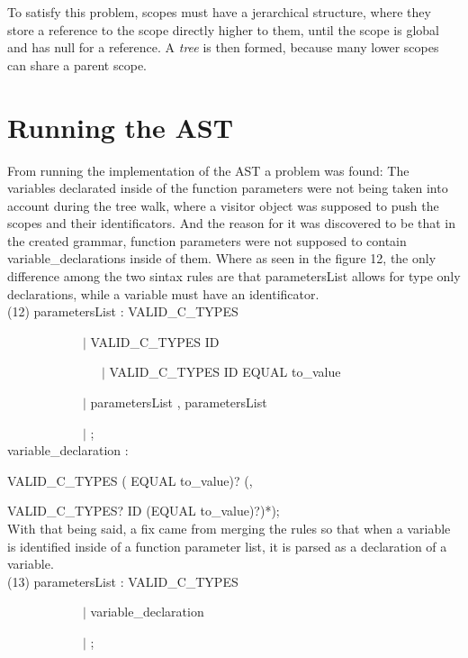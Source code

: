 \documentclass[twocolumn,10ptr]{article}
\begin{document}
To satisfy this problem, scopes must have a jerarchical structure, where they store a reference to the scope directly higher to them, until the scope is global and has null for a reference. A \textit{ tree} is then formed, because many lower scopes can share a parent scope.

\section{ Running the AST}
From running the implementation of the AST a problem was found: The variables declarated inside of the function parameters were not being taken into account during the tree walk, where a visitor object was supposed to push the scopes and their identificators. And the reason for it was discovered to be that in the created grammar, function parameters were not supposed to contain variable\_declarations inside of them. Where as seen in the figure 12, the only difference among the two sintax rules are that parametersList allows for type only declarations, while a variable must have an identificator.\\


(12) parametersList : VALID\_C\_TYPES

\ \ \ \ \ \ \ \ \ \ \ \      \(\mid\) VALID\_C\_TYPES ID
			
\ \ \ \ \ \ \ \ \ \ \ \ \ \ \    \(\mid\) VALID\_C\_TYPES ID EQUAL to\_value
			
\ \ \ \ \ \ \ \ \ \ \ \     \(\mid\) parametersList \textsc{},\textsc{}  parametersList
			
\ \ \ \ \ \ \ \ \ \ \ \   	\(\mid\) ;\\

			
variable\_declaration :  

VALID\_C\_TYPES ( EQUAL to\_value)? (\textsc{},\textsc{} 

VALID\_C\_TYPES? ID (EQUAL to\_value)?)*);\\

With that being said, a fix came from merging the rules so that when a variable is identified inside of a function parameter list, it is parsed as a declaration of a variable.\\

(13) parametersList : VALID\_C\_TYPES

\ \ \ \ \ \ \ \ \ \ \ \      \(\mid\) variable\_declaration
			
\ \ \ \ \ \ \ \ \ \ \ \   	\(\mid\) ;\\
\end{document}
